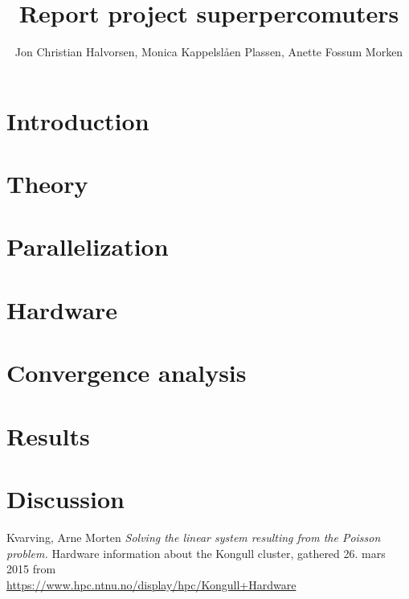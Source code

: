 \documentclass[12pt, a4paper]{article} %
\title{Report project superpercomuters}
\author[]{Jon Christian Halvorsen, Monica Kappelslåen Plassen, Anette Fossum Morken}
\date{}
\begin{document}
\maketitle
{}

\section*{Introduction}


\section*{Theory}


\section*{Parallelization}

 
\section*{Hardware}
 
 
\section*{Convergence analysis}


\section*{Results}


\section*{Discussion}



\begin{thebibliography}{10}
 Kvarving, Arne Morten \emph{Solving the linear system resulting from the Poisson problem.}
 Hardware information about the Kongull cluster, gathered 26. mars 2015 from \\ \url{https://www.hpc.ntnu.no/display/hpc/Kongull+Hardware}
\end{thebibliography}
\end{document}
